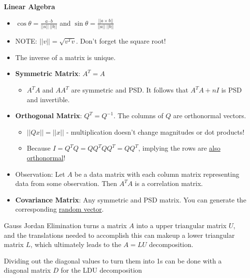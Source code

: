 \documentclass[12pt]{article} %
\begin{document}
\begin{center}
    \textbf{Linear Algebra}\\
\end{center}
\begin{itemize}[topsep=-3pt, itemsep = -1pt]
    \item $\cos{\theta} = \frac{a \cdot b}{||a|| \ ||b||}$ and $\sin{\theta} = \frac{||a \times b||}{||a|| \ ||b||}$
    \item NOTE: $||v|| = \sqrt{v^Tv}$. Don't forget the square root!
    \item The inverse of a matrix is unique.
\end{itemize}

\begin{itemize}[topsep=-3pt, itemsep=-1pt]
    \item \textbf{Symmetric Matrix}: $A^T = A$
    \begin{itemize}[topsep = -1pt]
        \item $A^TA$ and $AA^T$ are symmetric and PSD. It follows that $A^TA + nI$ is PSD and invertible.
    \end{itemize}
    \item \textbf{Orthogonal Matrix}: $Q^T = Q^{-1}$. The columns of $Q$ are orthonormal vectors.
    \begin{itemize}[topsep = -1pt]
        \item $||Qx|| = ||x||$ - multiplication doesn't change magnitudes or dot products!  
        \item Because $I = Q^TQ = QQ^TQQ^T = QQ^T$, implying the rows are \underline{also orthonormal}!
    \end{itemize}
    \item Observation: Let $A$ be a data matrix with each column matrix representing data from some observation. Then $A^TA$ is a correlation matrix.
    \item \textbf{Covariance Matrix}: Any symmetric and PSD matrix. You can generate the corresponding \href{https://stats.stackexchange.com/a/221238}{random vector}.
\end{itemize}

Gauss Jordan Elimination turns a matrix $A$ into a upper triangular matrix $U$, and the translations needed to accomplish this can makeup a lower triangular matrix $L$, which ultimately leads to the $A = LU$ decomposition. 

Dividing out the diagonal values to turn them into 1s can be done with a diagonal matrix $D$ for the LDU decomposition
\end{document}
